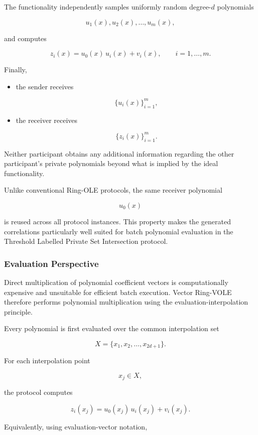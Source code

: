 \documentclass[11pt,a4paper]{article}
\begin{document}
The functionality independently samples uniformly random degree-$d$ polynomials

\[
u_1(x),
u_2(x),
\ldots,
u_m(x),
\]

and computes

\[
z_i(x)
=
u_0(x)\,u_i(x)+v_i(x),
\qquad
i=1,\ldots,m.
\]

Finally,

\begin{itemize}

\item the sender receives

\[
\{u_i(x)\}_{i=1}^{m},
\]

\item the receiver receives

\[
\{z_i(x)\}_{i=1}^{m}.
\]

\end{itemize}

Neither participant obtains any additional information regarding the other participant's private
polynomials beyond what is implied by the ideal functionality.

Unlike conventional Ring-OLE protocols, the same receiver polynomial

\[
u_0(x)
\]

is reused across all protocol instances. This property makes the generated correlations particularly
well suited for batch polynomial evaluation in the Threshold Labelled Private Set Intersection protocol.


\subsubsection{Evaluation Perspective}

Direct multiplication of polynomial coefficient vectors is computationally expensive and unsuitable for
efficient batch execution. Vector Ring-VOLE therefore performs polynomial multiplication using the
evaluation-interpolation principle.

Every polynomial is first evaluated over the common interpolation set

\[
X=\{x_1,x_2,\ldots,x_{2d+1}\}.
\]

For each interpolation point

\[
x_j\in X,
\]

the protocol computes

\[
z_i(x_j)
=
u_0(x_j)\,
u_i(x_j)
+
v_i(x_j).
\]

Equivalently, using evaluation-vector notation,
\end{document}
